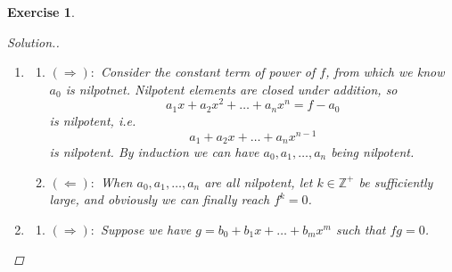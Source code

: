 \documentclass{article}
\theoremstyle{breakstyle}
\newtheorem{exercise}{Exercise}
\newenvironment{solution}
  {\begin{proof}[Solution.]\renewcommand{\qedsymbol}{}}
  {\end{proof}}
\begin{document}
\begin{exercise}
\begin{solution}
\begin{enumerate}[label=({\roman*})]
\begin{enumerate}[label=({\alph*})]
                        Moreover, $-a_{n}x^{n}$ is a nilpotent element in $A[x]$.
                        By \emph{Ex.1},
                        $$
                        f-a_{n}x^{n}=a_0+a_1x+\ldots +a_{n-1}x^{n-1}
                        $$
                        is a unit in $A[x]$, so by iterating the process above we'll see $a_{n-1},\ldots ,a_1$ are nilpotent.
                    \item $(\Leftarrow)$: By \emph{Ex.1}, the sum of a unit and a nilpotent element is a unit.
                        Notice $a_1x,a_2x^2,\ldots ,a_{n}s^{n}$ are nilpotent in $A[x]$ while $a_0$ is a unit in $A[x]$,
                        so their sum $f$ is a unit in $A[x]$.
                \end{enumerate}

            \item 
                \begin{enumerate}[label=({\alph*})]
                    \item $(\Rightarrow):$
                        Consider the constant term of power of $f$, from which we know $a_0$ is nilpotnet.
                        Nilpotent elements are closed under addition, so
                        $$
                        a_1x+a_2x^2+\ldots +a_{n}x^{n}=f-a_0
                        $$
                        is nilpotent, i.e.
                        $$
                        a_1+a_2x+\ldots +a_{n}x^{n-1}
                        $$
                        is nilpotent.
                        By induction we can have $a_0,a_1,\ldots ,a_{n}$ being nilpotent.
                    \item $(\Leftarrow):$
                        When $a_0,a_1,\ldots ,a_{n}$ are all nilpotent, let $k\in \mathbb{Z}^{+}$ be sufficiently large,
                        and obviously we can finally reach $f^{k}=0$.
                \end{enumerate}

            \item 
                \begin{enumerate}[label=({\alph*})]
                    \item $(\Rightarrow):$ 
                        Suppose we have $g=b_0+b_1x+\ldots +b_{m}x^{m}$ such that $fg=0$.


\end{enumerate}
\end{enumerate}
\end{solution}
\end{exercise}
\end{document}

